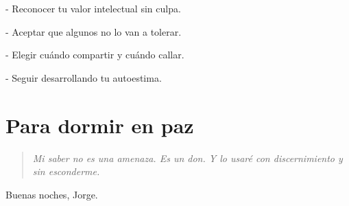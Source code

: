 \documentclass{article}%
\renewenvironment{quote}{\begin{quotation}\itshape\color{cita}}{\end{quotation}}%
\begin{document}

        \setlength{
-sep}{6pt}
        \renewcommand\labelitemi{\textcolor{myblue}{$\blacksquare$}}

- Reconocer tu valor intelectual sin culpa.

- Aceptar que algunos no lo van a tolerar.

- Elegir cuándo compartir y cuándo callar.

- Seguir desarrollando tu autoestima.

    

%
\section{Para dormir en paz}%
\label{sec:Paradormirenpaz}%
\begin{quote}%
Mi saber no es una amenaza. Es un don. Y lo usaré con discernimiento y sin esconderme.%
\end{quote}%
Buenas noches, Jorge.

%
\end{document}
